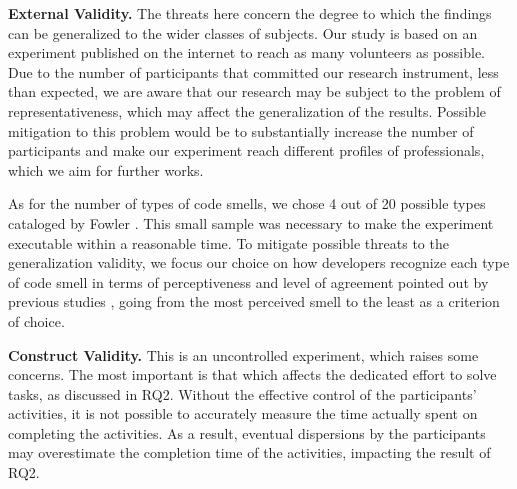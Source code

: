 \textbf{External Validity.} The threats here concern the degree to which the findings can be generalized to the wider classes of subjects. Our study is based on an experiment published on the internet to reach as many volunteers as possible. Due to the number of participants that committed our research instrument, less than expected, we are aware that our research may be subject to the problem of representativeness, which may affect the generalization of the results. Possible mitigation to this problem would be to substantially increase the number of participants and make our experiment reach different profiles of professionals, which we aim for further works. 

As for the number of types of code smells, we chose 4 out of 20 possible types cataloged by Fowler \cite{fowler1999refactoring}. This small sample was necessary to make the experiment executable within a reasonable time. To mitigate possible threats to the generalization validity, we focus our choice on how developers recognize each type of code smell in terms of perceptiveness and level of agreement pointed out by previous studies \cite{palomba2014they, hozano2018you}, going from the most perceived smell to the least as a criterion of choice. 


\textbf{Construct Validity.} This is an uncontrolled experiment, which raises some concerns. The most important is that which affects the dedicated effort to solve tasks, as discussed in RQ2. Without the effective control of the participants' activities, it is not possible to accurately measure the time actually spent on completing the activities. As a result, eventual dispersions by the participants may overestimate the completion time of the activities, impacting the result of RQ2.



